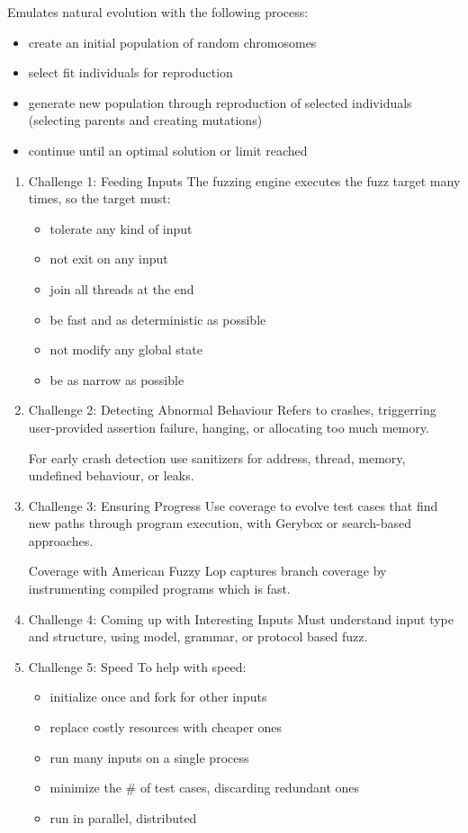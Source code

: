 \documentclass[11pt]{article}
\begin{document}
Emulates natural evolution with the following process:
\begin{itemize}
\item create an initial population of random chromosomes
\item select fit individuals for reproduction
\item generate new population through reproduction of selected individuals
(selecting parents and creating mutations)
\item continue until an optimal solution or limit reached
\end{itemize}
\begin{enumerate}
\item Challenge 1: Feeding Inputs
\label{sec:orgab242ce}
The fuzzing engine executes the fuzz target many times, so the target must:
\begin{itemize}
\item tolerate any kind of input
\item not exit on any input
\item join all threads at the end
\item be fast and as deterministic as possible
\item not modify any global state
\item be as narrow as possible
\end{itemize}
\item Challenge 2: Detecting Abnormal Behaviour
\label{sec:org07baee8}
Refers to crashes, triggerring user-provided assertion failure, hanging,
or allocating too much memory.

For early crash detection use sanitizers for address, thread, memory,
undefined behaviour, or leaks.
\item Challenge 3: Ensuring Progress
\label{sec:orgd3ef699}
Use coverage to evolve test cases that find new paths through program
execution, with Gerybox or search-based approaches.

Coverage with American Fuzzy Lop captures branch coverage by
instrumenting compiled programs which is fast.
\item Challenge 4: Coming up with Interesting Inputs
\label{sec:org5744615}
Must understand input type and structure, using model, grammar, or
protocol based fuzz.
\item Challenge 5: Speed
\label{sec:org14cbfe3}
To help with speed:
\begin{itemize}
\item initialize once and fork for other inputs
\item replace costly resources with cheaper ones
\item run many inputs on a single process
\item minimize the \# of test cases, discarding redundant ones
\item run in parallel, distributed
\end{itemize}
\end{enumerate}
\end{document}

